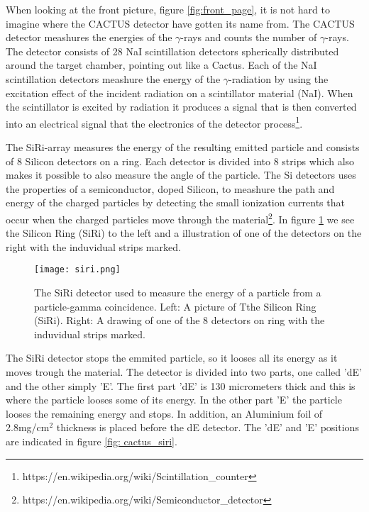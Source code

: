 \documentclass[11pt,a4wide]{article}
\begin{document}
When looking at the front picture, figure \ref{fig:front_page}, it is not hard to imagine where the CACTUS detector have gotten its name from. The CACTUS detector meashures the energies of the $\gamma$-rays and counts the number of $\gamma$-rays. The detector consists of 28 NaI scintillation detectors spherically distributed around the target chamber, pointing out like a Cactus. Each of the NaI scintillation detectors  meashure the energy of the $\gamma$-radiation by using the excitation effect of the incident radiation on a scintillator material (NaI). When the scintillator is excited by radiation it produces a signal that is then converted into an electrical signal that the electronics of the detector process\footnote{https://en.wikipedia.org/wiki/Scintillation\_counter}. 

The SiRi-array measures the energy of the resulting emitted particle and consists of 8 Silicon detectors on a ring. Each detector is divided into 8 strips which also makes it possible to also measure the angle of the particle. The Si detectors uses the properties of a semiconductor, doped Silicon, to meashure the path and energy of the charged particles by detecting the small ionization currents that occur when the charged particles move through the material\footnote{https://en.wikipedia.org/wiki/Semiconductor\_detector}. In figure \ref{fig: siri} we see the Silicon Ring (SiRi) to the left and a illustration of one of the detectors on the right with the induvidual strips marked.
\begin{figure}[htp]
\centering
\texttt{[image: siri.png]}
\caption{The SiRi detector used to measure the energy of a particle from a particle-gamma coincidence. Left: A picture of Tthe Silicon Ring (SiRi). Right: A drawing of one of the 8 detectors on ring with the induvidual strips marked.}
\label{fig: siri}
\end{figure}

The SiRi detector stops the emmited particle, so it looses all its energy as it moves trough the material. The detector is divided into two parts, one called 'dE' and the other simply 'E'. The first part 'dE' is 130 micrometers thick and this is where the particle looses some of its energy. In the other part 'E' the particle looses the remaining energy and stops. In addition, an Aluminium foil of 2.8mg/cm${}^2$ thickness is placed before the dE detector. The 'dE' and 'E' positions are indicated in figure \ref{fig: cactus_siri}.

\end{document}
